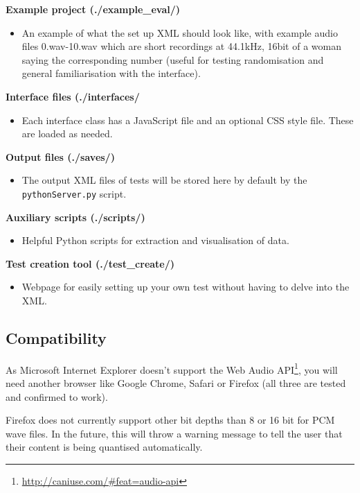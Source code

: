 \documentclass[11pt, oneside]{article}   	%
\begin{document}
         \textbf{Example project (./example\_eval/)}
            	\begin{itemize}
            		\item An example of what the set up XML should look like, with example audio files 0.wav-10.wav which are short recordings at 44.1kHz, 16bit of a woman saying the corresponding number (useful for testing randomisation and general familiarisation with the interface).\\ 
            	\end{itemize}
          \textbf{Interface files (./interfaces/}
              \begin{itemize}
                  \item Each interface class has a JavaScript file and an optional CSS style file. These are loaded as needed.
              \end{itemize}

          \textbf{Output files (./saves/)}
            	\begin{itemize}
            		\item The output XML files of tests will be stored here by default by the \texttt{pythonServer.py} script.\\ 
            	\end{itemize}
          \textbf{Auxiliary scripts (./scripts/)}
            	\begin{itemize}
            		\item Helpful Python scripts for extraction and visualisation of data.\\ 
            	\end{itemize}
          \textbf{Test creation tool (./test\_create/)}
            	\begin{itemize}
            		\item Webpage for easily setting up your own test without having to delve into the XML.\\ 
            	\end{itemize}
                    	
	\subsection{Compatibility}
		As Microsoft Internet Explorer doesn't support the Web Audio API\footnote{\url{http://caniuse.com/\#feat=audio-api}}, you will need another browser like Google Chrome, Safari or Firefox (all three are tested and confirmed to work). 

		Firefox does not currently support other bit depths than 8 or 16 bit for PCM wave files. In the future, this will throw a warning message to tell the user that their content is being quantised automatically. %
		
\end{document}
